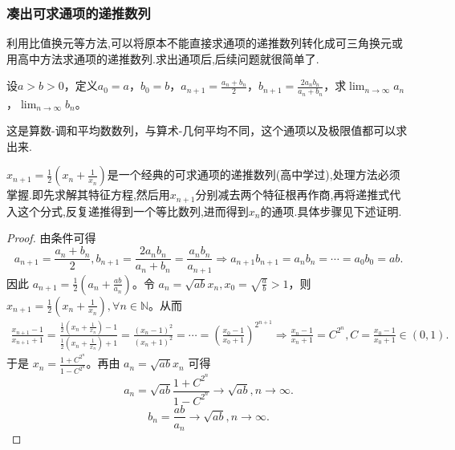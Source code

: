\documentclass[../../main.tex]{subfiles}%
\begin{document}
\subsubsection{凑出可求通项的递推数列}

利用比值换元等方法,可以将原本不能直接求通项的递推数列转化成可三角换元或用高中方法求通项的递推数列.求出通项后,后续问题就很简单了.

\begin{example}
设\(a > b>0\)，定义\(a_0 = a\)，\(b_0 = b\)，\(a_{n + 1}=\frac{a_n + b_n}{2}\)，\(b_{n + 1}=\frac{2a_nb_n}{a_n + b_n}\)，求\(\lim_{n\rightarrow\infty}a_n\)，\(\lim_{n\rightarrow\infty}b_n\)。
\end{example}
\begin{remark}
这是算数-调和平均数数列，与算术-几何平均不同，这个通项以及极限值都可以求出来.
\end{remark}\begin{note}
\(x_{n + 1}=\frac{1}{2}\left(x_n+\frac{1}{x_n}\right)\)是一个经典的可求通项的递推数列(高中学过),处理方法必须掌握.即先求解其特征方程,然后用$x_{n+1}$分别减去两个特征根再作商,再将递推式代入这个分式,反复递推得到一个等比数列,进而得到$x_n$的通项.具体步骤见下述证明.
\end{note}
\begin{proof}

由条件可得
\[
a_{n + 1}=\frac{a_n + b_n}{2},b_{n + 1}=\frac{2a_nb_n}{a_n + b_n}=\frac{a_nb_n}{a_{n + 1}}\Rightarrow a_{n + 1}b_{n + 1}=a_nb_n=\cdots =a_0b_0 = ab.
\]
因此 \(a_{n + 1}=\frac{1}{2}\left(a_n+\frac{ab}{a_n}\right)\)。令 \(a_n=\sqrt{ab}x_n,x_0=\sqrt{\frac{a}{b}}>1\)，则 \(x_{n + 1}=\frac{1}{2}\left(x_n+\frac{1}{x_n}\right),\forall n\in \mathbb{N}\)。从而
\begin{align*}
\frac{x_{n+1}-1}{x_{n+1}+1}=\frac{\frac{1}{2}\left( x_n+\frac{1}{x_n} \right) -1}{\frac{1}{2}\left( x_n+\frac{1}{x_n} \right) +1}=\frac{(x_n-1)^2}{(x_n+1)^2}=\cdots =\left( \frac{x_0-1}{x_0+1} \right) ^{2^{n+1}}\Rightarrow \frac{x_n-1}{x_n+1}=C^{2^n},C=\frac{x_0-1}{x_0+1}\in (0,1).
\end{align*}
于是 \(x_n=\frac{1 + C^{2^n}}{1 - C^{2^n}}\)。再由 \(a_n=\sqrt{ab}x_n\) 可得
\[
a_n=\sqrt{ab}\frac{1 + C^{2^n}}{1 - C^{2^n}}\rightarrow\sqrt{ab},n\rightarrow\infty.
\]
\[
b_n=\frac{ab}{a_n}\rightarrow\sqrt{ab},n\rightarrow\infty.
\]

\end{proof}
\end{document}
